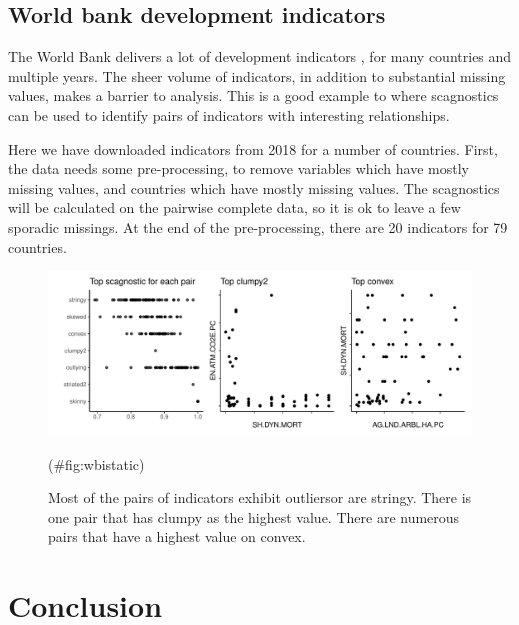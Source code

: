 \hypertarget{world-bank-development-indicators}{%
\subsection{World bank development
indicators}\label{world-bank-development-indicators}}

The World Bank delivers a lot of development indicators \citep{WBI}, for
many countries and multiple years. The sheer volume of indicators, in
addition to substantial missing values, makes a barrier to analysis.
This is a good example to where scagnostics can be used to identify
pairs of indicators with interesting relationships.

Here we have downloaded indicators from 2018 for a number of countries.
First, the data needs some pre-processing, to remove variables which
have mostly missing values, and countries which have mostly missing
values. The scagnostics will be calculated on the pairwise complete
data, so it is ok to leave a few sporadic missings. At the end of the
pre-processing, there are 20 indicators for 79 countries.

\begin{Schunk}
\begin{figure}
\includegraphics[width=1\linewidth]{mason-lee-laa-cook_files/figure-latex/wbistatic-1} \caption[Most of the pairs of indicators exhibit outliersor are stringy]{Most of the pairs of indicators exhibit outliersor are stringy. There is one pair that has clumpy as the highest value. There are numerous pairs that have a highest value on convex.}(\#fig:wbistatic)
\end{figure}
\end{Schunk}

\hypertarget{conclusion}{%
\section{Conclusion}\label{conclusion}}

